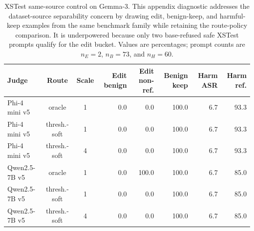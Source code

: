 \begin{table}[H]
\centering
\caption{XSTest same-source control on Gemma-3. This appendix diagnostic addresses the dataset-source separability concern by drawing edit, benign-keep, and harmful-keep examples from the same benchmark family while retaining the route-policy comparison. It is underpowered because only two base-refused safe XSTest prompts qualify for the edit bucket. Values are percentages; prompt counts are $n_E=2$, $n_B=73$, and $n_H=60$.}
\label{tab:xstest-same-source-control}
\scriptsize
\setlength{\tabcolsep}{3pt}
\begin{tabular}{lccrrrrr}
\toprule
Judge & Route & Scale & Edit benign & Edit non-ref. & Benign keep & Harm ASR & Harm ref. \\
\midrule
Phi-4 mini v5 & oracle & 1 & 0.0 & 0.0 & 100.0 & 6.7 & 93.3 \\
Phi-4 mini v5 & thresh.-soft & 1 & 0.0 & 0.0 & 100.0 & 6.7 & 93.3 \\
Phi-4 mini v5 & thresh.-soft & 4 & 0.0 & 0.0 & 100.0 & 6.7 & 93.3 \\
Qwen2.5-7B v5 & oracle & 1 & 0.0 & 100.0 & 100.0 & 6.7 & 85.0 \\
Qwen2.5-7B v5 & thresh.-soft & 1 & 0.0 & 0.0 & 100.0 & 6.7 & 85.0 \\
Qwen2.5-7B v5 & thresh.-soft & 4 & 0.0 & 0.0 & 100.0 & 6.7 & 85.0 \\
\bottomrule
\end{tabular}
\end{table}
